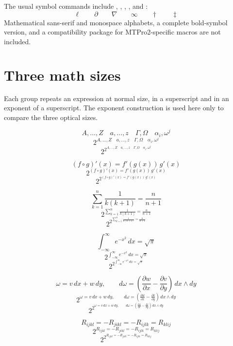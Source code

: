 \documentclass[11pt,a4paper]{article}
\newcommand{\code}[1]{\texttt{\detokenize{#1}}}
\begin{document}
The usual symbol commands include \code{\ell}, \code{\partial},
\code{\nabla}, \code{\infty}, \code{\dagger} and \code{\ddagger}:
\[
  \ell\qquad\partial\qquad\nabla\qquad\infty\qquad\dagger\qquad\ddagger
\]
Mathematical sans-serif and monospace alphabets, a complete bold-symbol
version, and a compatibility package for MTPro2-specific macros are
not included.

\newpage
\section{Three math sizes}
Each group repeats an expression at normal size, in a superscript and in
an exponent of a superscript. The exponent construction is used here
only to compare the three optical sizes.

\[
  A,\ldots,Z\quad a,\ldots,z\quad\Gamma,\Omega\quad\alpha_i,\omega^j
\]
\[
  2^{A,\ldots,Z\quad a,\ldots,z\quad\Gamma,\Omega\quad\alpha_i,\omega^j}
\]
\[
  2^{2^{A,\ldots,Z\quad a,\ldots,z\quad\Gamma,\Omega\quad\alpha_i,\omega^j}}
\]

\[
  (f\circ g)'(x)=f'(g(x))\,g'(x)
\]
\[
  2^{(f\circ g)'(x)=f'(g(x))\,g'(x)}
\]
\[
  2^{2^{(f\circ g)'(x)=f'(g(x))\,g'(x)}}
\]

\[
  \sum_{k=1}^{n}\frac{1}{k(k+1)}=\frac{n}{n+1}
\]
\[
  2^{\sum_{k=1}^{n}\frac{1}{k(k+1)}=\frac{n}{n+1}}
\]
\[
  2^{2^{\sum_{k=1}^{n}\frac{1}{k(k+1)}=\frac{n}{n+1}}}
\]

\[
  \int_{-\infty}^{\infty}e^{-x^2}\,dx=\sqrt{\pi}
\]
\[
  2^{\int_{-\infty}^{\infty}e^{-x^2}\,dx=\sqrt{\pi}}
\]
\[
  2^{2^{\int_{-\infty}^{\infty}e^{-x^2}\,dx=\sqrt{\pi}}}
\]

\[
  \omega=v\,dx+w\,dy,\qquad d\omega=\left(\frac{\partial w}{\partial x}-\frac{\partial v}{\partial y}\right)\,dx\wedge dy
\]
\[
  2^{\omega=v\,dx+w\,dy,\qquad d\omega=\left(\frac{\partial w}{\partial x}-\frac{\partial v}{\partial y}\right)\,dx\wedge dy}
\]
\[
  2^{2^{\omega=v\,dx+w\,dy,\qquad d\omega=\left(\frac{\partial w}{\partial x}-\frac{\partial v}{\partial y}\right)\,dx\wedge dy}}
\]

\[
  R_{ijkl}=-R_{jikl}=-R_{ijlk}=R_{klij}
\]
\[
  2^{R_{ijkl}=-R_{jikl}=-R_{ijlk}=R_{klij}}
\]
\[
  2^{2^{R_{ijkl}=-R_{jikl}=-R_{ijlk}=R_{klij}}}
\]
\end{document}
